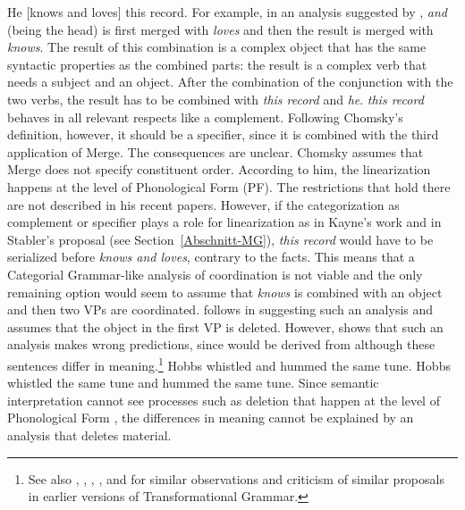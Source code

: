 \ea
\label{ex-he-knows-and-loves-this-record-MP}
He [knows and loves] this record.
\z
For example, in an analysis suggested by \citet[]{Steedman91a}, \emph{and} (being the head)
is first merged with \emph{loves} and then the result is merged with \emph{knows}. The result of this combination is a complex object
that has the same syntactic properties as the combined parts: the result is a complex verb that needs a
subject and an object. After the combination of the conjunction with the two verbs, the result has to
be combined with \emph{this record} and \emph{he}. \emph{this record} behaves in all relevant
respects like a complement. Following Chomsky's definition, however, it should be a specifier, since it is combined
with the third application of Merge. The consequences are unclear. Chomsky assumes that Merge does
not specify constituent order. According to him, the linearization happens at the level of
Phonological Form (PF). The restrictions that hold there are not described in his recent
papers. However, if the categorization as complement or specifier plays a role for linearization as
in Kayne's work \citeyearpar[, 12]{Kayne2011a} and in Stabler's proposal (see
Section~\ref{Abschnitt-MG}), \emph{this record} would have to be serialized before \emph{knows and
  loves}, contrary to the facts. This means that a Categorial Grammar-like analysis of coordination
is not viable and the only remaining option would seem to assume that \emph{knows} is combined with
an object and then two VPs are coordinated. \citet[, 67]{Kayne94a-u} follows 
\citet[]{WC80a-u} in suggesting such an analysis and assumes that the object in the first
VP is deleted. However, \citet[]{Borsley2005a} shows that such an analysis makes wrong
predictions, since  would be derived from  although these sentences differ in meaning.\footnote{%
  See also , , , ,  and  for similar
    observations and criticism of similar proposals in earlier versions of Transformational Grammar.
}
\eal
\ex\label{ex-whistled-a} Hobbs whistled and hummed the same tune.
\ex\label{ex-whistled-b} Hobbs whistled the same tune and hummed the same tune.
\zl
Since semantic interpretation cannot see processes such as deletion that happen at the level of
Phonological Form \citep[Chapter~3]{Chomsky95a-u}, the differences in meaning cannot be explained by an
analysis that deletes material.

